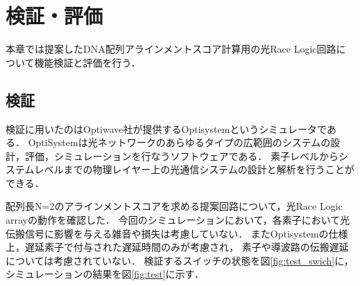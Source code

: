\chapter{検証・評価}
本章では提案したDNA配列アラインメントスコア計算用の光Race Logic回路について機能検証と評価を行う．
\section{検証}
検証に用いたのはOptiwave社が提供するOptisystemというシミュレータである．
OptiSystemは光ネットワークのあらゆるタイプの広範囲のシステムの設計，評価，シミュレーションを行なうソフトウェアである．
素子レベルからシステムレベルまでの物理レイヤー上の光通信システムの設計と解析を行うことができる．

配列長N=2のアラインメントスコアを求める提案回路について，光Race Logic arrayの動作を確認した．
今回のシミュレーションにおいて，各素子において光伝搬信号に影響を与える雑音や損失は考慮していない．
またOptisystemの仕様上，遅延素子で付与された遅延時間のみが考慮され，
素子や導波路の伝搬遅延については考慮されていない．
検証するスイッチの状態を図\ref{fig:test_swich}に，
シミュレーションの結果を図\ref{fig:test}に示す．
